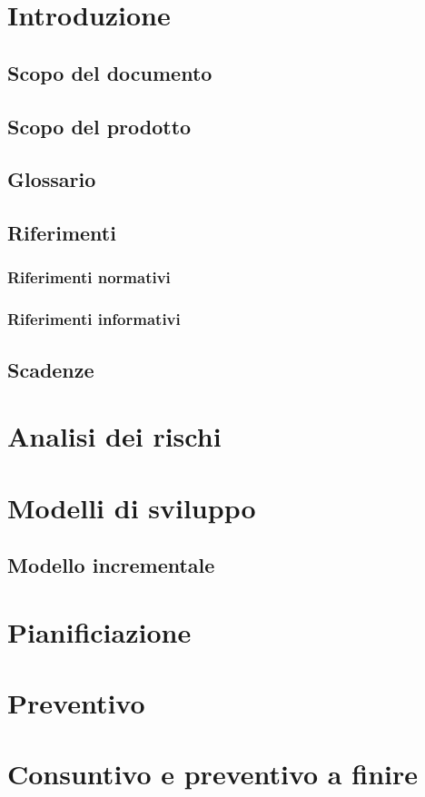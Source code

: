 \documentclass[a4paper, oneside, openany, dvipsnames, table]{article}
\begin{document}
\copertina{}


\newpage
\tableofcontents
\newpage

\section{Introduzione}
	\subsection{Scopo del documento}
		
	\subsection{Scopo del prodotto}
		
	\subsection{Glossario}
		
	\subsection{Riferimenti}
		\subsubsection{Riferimenti normativi}
			
		\subsubsection{Riferimenti informativi}
			
	\subsection{Scadenze}
		
\section{Analisi dei rischi}
	
	
\section{Modelli di sviluppo}
	
	\subsection{Modello incrementale}
		
\section{Pianificiazione}
\section{Preventivo}
\section{Consuntivo e preventivo a finire}
\end{document}
